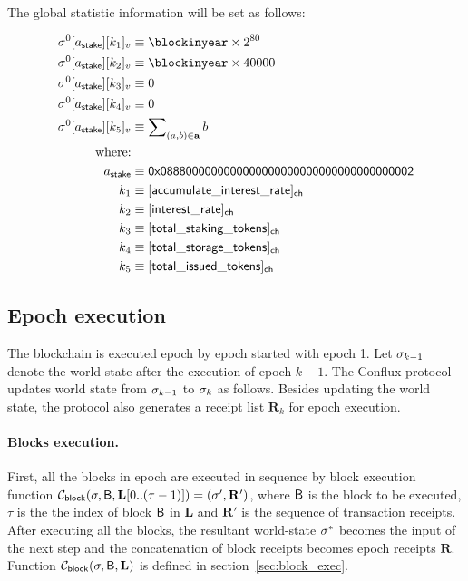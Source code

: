 The global statistic information will be set as follows:

\begin{align}
	\st^0[a_{\sf stake}][k_1]_v & \eqdef \blockinyear\times 2^{80} \\ 
	\st^0[a_{\sf stake}][k_2]_v & \eqdef \blockinyear\times 40000 \\
	\st^0[a_{\sf stake}][k_3]_v & \eqdef 0 \\
	\st^0[a_{\sf stake}][k_4]_v & \eqdef 0 \\
	\st^0[a_{\sf stake}][k_5]_v & \eqdef \sum\nolimits_{(a,b)\in \vec{a}} b \\
	\mbox{where:}&\\
	a_{\sf stake} &\eqdef \stakingcontract \\
	k_1 &\eqdef \sf [accumulate\char`_interest\char`_rate]_{\sf ch} \\ 
	k_2 &\eqdef \sf [interest\char`_rate]_{\sf ch} \\
    k_3 &\eqdef \sf [total\char`_staking\char`_tokens]_{\sf ch} \\
    k_4 &\eqdef \sf [total\char`_storage\char`_tokens]_{\sf ch} \\
    k_5 &\eqdef \sf [total\char`_issued\char`_tokens]_{\sf ch} 
\end{align}


\subsection{Epoch execution}

The blockchain is executed epoch by epoch started with epoch 1. Let $\mathbf{\sigma}_{k-1}$ denote the world state after the execution of epoch $k-1$. The Conflux protocol updates world state from $\mathbf{\sigma}_{k-1}$ to $\mathbf{\sigma}_k$ as follows. Besides updating the world state, the protocol also generates a receipt list $\mathbf{R}_k$ for epoch execution. 

\paragraph{Blocks execution. } First, all the blocks in epoch are executed in sequence by block execution function $\mathcal{C}_{\sf block}(\mathbf{\sigma},\textsf{B},\mathbf{L}[0..(\tau-1)])=(\mathbf{\sigma}',\mathbf{R}')$, where $\textsf{B}$ is the block to be executed, $\tau$ is the the index of block $\textsf{B}$ in $\mathbf{L}$ and $\mathbf{R}'$ is the sequence of transaction receipts. After executing all the blocks, the resultant world-state $\mathbf{\sigma}^*$ becomes the input of the next step and the concatenation of block receipts becomes epoch receipts $\mathbf{R}$. Function $\mathcal{C}_{\sf block}(\mathbf{\sigma},\textsf{B},\mathbf{L})$ is defined in section~\ref{sec:block_exec}.

